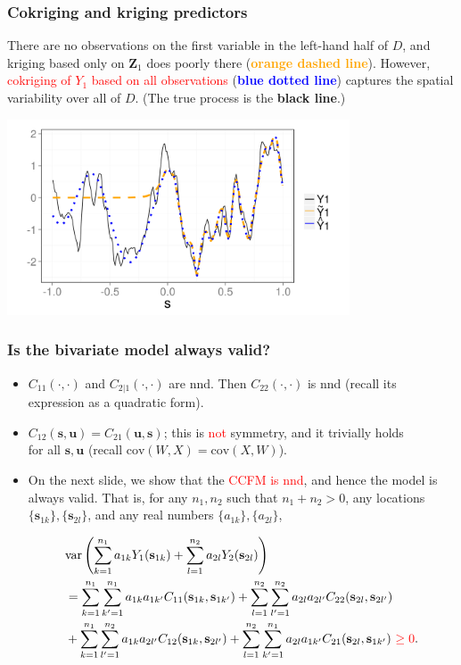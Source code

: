 \documentclass{beamer}
\newcommand{\svec} {\textbf{s}}
\newcommand{\uvec} {\textbf{u}}
\newcommand{\s}{\mathbf{s}}
\renewcommand{\u}{\mathbf{u}}
\newcommand{\Zvec}{\mathbf{Z}}
\newcommand{\cov}{\mathrm{cov}}
\newcommand{\var}{\mathrm{var}}
\begin{document}

\begin{frame}
\frametitle{Cokriging and kriging predictors}
There are no observations on the first variable in the left-hand half of $D$, and kriging based only on $\Zvec_1$ does poorly there ({\bf \textcolor{orange}{orange dashed line}}). However, \textcolor{red}{cokriging of $Y_1$ based on all observations} ({\bf \textcolor{blue}{blue dotted line}}) captures the spatial variability over all of $D$. (The true process is the \textbf{black line}.)
\vspace{-.5cm}
\begin{center}
\includegraphics[width=4in]{./sim_est.png}
\end{center}
\end{frame}


\begin{frame}
\frametitle{Is the bivariate model always valid?}

\begin{itemize}
\item $C_{11}(\cdot,\cdot)$ and $C_{2|1}(\cdot,\cdot)$ are nnd. Then $C_{22}(\cdot,\cdot)$ is nnd (recall its expression as a quadratic form).
\item $C_{12}(\svec,\uvec) = C_{21}(\uvec,\svec)$; this is \textcolor{red}{not} symmetry, and it trivially holds \\for all $\s,\u$ (recall $\cov(W,X)=\cov(X,W)$).
\item On the next slide, we show that the \textcolor{red}{CCFM is nnd}, and hence the model is always valid. That is, for any $n_1,n_2$ such that $n_1 + n_2 > 0$, any locations $\{\svec_{1k}\}, \{\svec_{2l}\}$, and any real numbers $\{a_{1k}\},\{a_{2l}\}$,

\small
\begin{align*}
 & \var\left(\sum_{k=1}^{n_1}{a_{1k}Y_1(\s_{1k})}+\sum_{l=1}^{n_2}{a_{2l}Y_2(\s_{2l})}\right) \\ &=\sum_{k=1}^{n_1}\sum_{k'=1}^{n_1} a_{1k}a_{1k'}C_{11}(\s_{1k},\s_{1k'})+\sum_{l=1}^{n_2}\sum_{l'=1}^{n_2} a_{2l}a_{2l'}C_{22}(\s_{2l},\s_{2l'}) \\
  &+\sum_{k=1}^{n_1}\sum_{l'=1}^{n_2} a_{1k}a_{2l'}C_{12}(\s_{1k},\s_{2l'})+\sum_{l=1}^{n_2}\sum_{k'=1}^{n_1} a_{2l}a_{1k'}C_{21}(\s_{2l},\s_{1k'})~ \textcolor{red}{\ge 0}.
\end{align*}

\normalsize
\end{itemize}
\end{frame}
\end{document}
